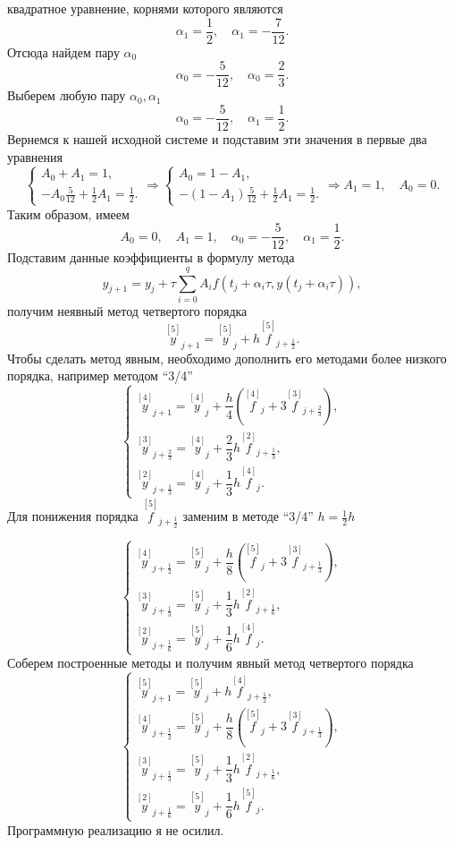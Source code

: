\documentclass[11pt]{article}
\begin{document}
квадратное уравнение, корнями которого являются
\[\alpha_1 = \frac{1}{2},\quad \alpha_1=-\frac{7}{12}.\] Отсюда найдем
пару \(\alpha_0\)
\[\alpha_0 = -\frac{5}{12},\quad \alpha_0 = \frac{2}{3}.\] Выберем любую
пару \(\alpha_0, \alpha_1\)
\[\alpha_0 = -\frac{5}{12},\quad \alpha_1 = \frac{1}{2}.\] Вернемся к
нашей исходной системе и подставим эти значения в первые два уравнения
\[\begin{cases}
A_0+A_1 = 1,\\
-A_0\frac{5}{12}+\frac{1}{2}A_1=\frac{1}{2}.
\end{cases} \Rightarrow \begin{cases}
A_0=1-A_1,\\
-(1-A_1)\frac{5}{12}+\frac{1}{2}A_1=\frac{1}{2}.
\end{cases}\Rightarrow A_1=1,\quad A_0=0.\] Таким образом, имеем
\[A_0=0,\quad A_1=1,\quad \alpha_0 = -\frac{5}{12},\quad \alpha_1 = \frac{1}{2}.\]
Подставим данные коэффициенты в формулу метода
\[y_{j+1} = y_j + \tau \sum_{i=0}^{q}A_if(t_j + \alpha_i \tau, y(t_j + \alpha_i \tau)),\]
получим неявный метод четвертого порядка\\
\[\overset{[5]}y_{j+1}=\overset{[5]}y_j+h\overset{[5]}f_{j+\frac{1}{2}}.\]
Чтобы сделать метод явным, необходимо дополнить его методами более
низкого порядка, например методом ``3/4'' \[\begin{cases}
            \overset{[4]}{y}_{j+1} = \overset{[4]}{y}_j + \dfrac{h}{4}\left(\overset{[4]}{f}_j +3 \overset{[3]}{f}_{j+\frac23}\right),\\
        \overset{[3]}{y}_{j+\frac23} = \overset{[4]}{y}_j + \dfrac23h\overset{[2]}{f}_{j+\frac13},\\
        \overset{[2]}{y}_{j+\frac13} = \overset{[4]}{y}_j + \dfrac13h\overset{[4]}{f}_{j}.
        \end{cases}\] Для понижения порядка
\(\overset{[5]}f_{j+\frac{1}{2}}\) заменим в методе ``3/4''
\(h=\frac{1}{2}h\)

    \[\begin{cases}
\overset{[4]}{y}_{j+\frac{1}{2}} = \overset{[5]}{y}_j + \dfrac{h}{8}\left(\overset{[5]}{f}_j +3 \overset{[3]}{f}_{j+\frac13}\right),\\
\overset{[3]}{y}_{j+\frac13} = \overset{[5]}{y}_j + \dfrac13h\overset{[2]}{f}_{j+\frac16},\\
\overset{[2]}{y}_{j+\frac16} = \overset{[5]}{y}_j + \dfrac16h\overset{[4]}{f}_{j}.
\end{cases}\] Соберем построенные методы и получим явный метод
четвертого порядка \[\begin{cases}
\overset{[5]}y_{j+1}=\overset{[5]}y_j+h\overset{[4]}f_{j+\frac{1}{2}}, \\
\overset{[4]}{y}_{j+\frac{1}{2}} = \overset{[5]}{y}_j + \dfrac{h}{8}\left(\overset{[5]}{f}_j +3 \overset{[3]}{f}_{j+\frac13}\right),\\
\overset{[3]}{y}_{j+\frac13} = \overset{[5]}{y}_j + \dfrac13h\overset{[2]}{f}_{j+\frac16},\\
\overset{[2]}{y}_{j+\frac16} = \overset{[5]}{y}_j + \dfrac16h\overset{[5]}{f}_{j}.
\end{cases}\] Программную реализацию я не осилил.
\end{document}
